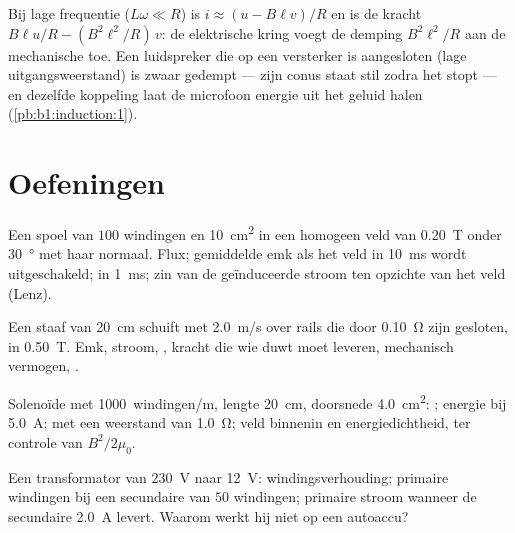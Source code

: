 \begin{remark}\label{rem:b1:induction:damping}
Bij lage frequentie ($L\omega \ll R$) is $i \approx (u - B\ell v)/R$ en is de kracht
$B\ell u/R - (B^2\ell^2/R)\,v$: de elektrische kring voegt de demping
$B^2\ell^2/R$ aan de mechanische toe. Een luidspreker die op een
versterker is aangesloten (lage uitgangsweerstand) is zwaar gedempt --- zijn conus staat stil
zodra het  stopt --- en dezelfde koppeling laat de
microfoon energie uit het geluid halen (\cref{pb:b1:induction:1}).
\end{remark}

\section{Oefeningen}

\begin{exercise}[$\star$]\label{exo:b1:induction:1}
Een spoel van $100$ windingen en \qty{10}{cm^2} in een homogeen veld van \qty{0.20}{T} onder
\qty{30}{\degree} met haar normaal. Flux; gemiddelde emk als het veld in
\qty{10}{ms} wordt uitgeschakeld; in \qty{1}{ms}; zin van de geïnduceerde stroom
ten opzichte van het veld (Lenz).
\end{exercise}

\begin{exercise}[$\star$]\label{exo:b1:induction:2}
Een staaf van \qty{20}{cm} schuift met \qty{2.0}{m/s} over rails die door
\qty{0.10}{\ohm} zijn gesloten, in \qty{0.50}{T}. Emk, stroom, , kracht die
wie duwt moet leveren, mechanisch vermogen, .
\end{exercise}

\begin{exercise}[$\star$]\label{exo:b1:induction:3}
Solenoïde met \qty{1000}{windingen/m}, lengte \qty{20}{cm}, doorsnede \qty{4.0}{cm^2}:
; energie bij \qty{5.0}{A};  met een weerstand van
\qty{1.0}{\ohm}; veld binnenin en energiedichtheid, ter controle van $B^2/2\mu_0$.
\end{exercise}

\begin{exercise}[$\star$]\label{exo:b1:induction:4}
Een transformator van \qty{230}{V} naar \qty{12}{V}: windingsverhouding; primaire
windingen bij een secundaire van $50$ windingen; primaire stroom wanneer de secundaire
\qty{2.0}{A} levert. Waarom werkt hij niet op een autoaccu?
\end{exercise}

